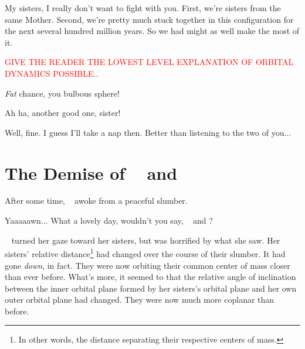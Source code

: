 \documentclass[main.tex]{subfiles}
\begin{document}
\par \Celaeno My sisters, I really don't want to fight with you.  First, we're sisters from the same Mother.  Second, we're pretty much stuck together in this configuration for the next several hundred million years.  So we had might as well make the most of it.

\begin{tcolorbox}[sharp corners, colback=red!30, colframe=red!80!blue, title=Orbital Dynamics I]
\par \textcolor{red}{GIVE THE READER THE LOWEST LEVEL EXPLANATION OF ORBITAL DYNAMICS POSSIBLE.}.  
\end{tcolorbox}

\par \Taygete \textit{Fat} chance, you bulbous sphere!

\par \Alcyone Ah ha, another good one, sister!

\par \Celaeno Well, fine.  I guess I'll take a nap then.  Better than listening to the two of you...

\section{The Demise of \rmtaygete~ and \rmalcyone}

\par \nar After some time, \rmcelaeno~ awoke from a peaceful slumber.  

\par \Celaeno Yaaaaawn... What a lovely day, wouldn't you say, \rmtaygete~ and \rmalcyone?

\par \nar \rmcelaeno~ turned her gaze toward her sisters, but was horrified by what she saw.  Her sisters' relative distance\footnote{In other words, the distance separating their respective centers of mass.} had changed over the course of their slumber.  It had gone \textit{down}, in fact.  They were now orbiting their common center of mass closer than ever before.  What's more, it seemed to \rmcelaeno that the relative angle of inclination between the inner orbital plane formed by her sisters's orbital plane and her own outer orbital plane had changed.  They were now much more coplanar than before.

\end{document}
